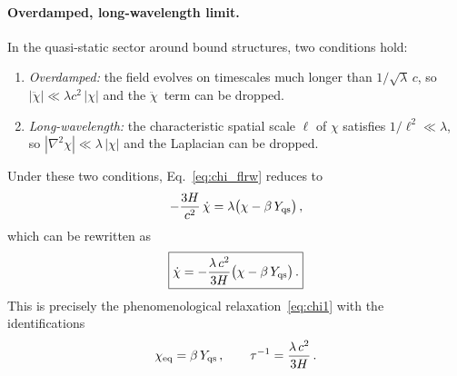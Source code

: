 \documentclass[11pt]{article}
\begin{document}
\paragraph{Overdamped, long-wavelength limit.}
In the quasi-static sector around bound structures,
two conditions hold:
\begin{enumerate}
\item \emph{Overdamped:} the field evolves on
  timescales much longer than $1/\sqrt{\lambda}\,c$,
  so $|\ddot\chi| \ll \lambda c^2\,|\chi|$ and
  the $\ddot\chi$~term can be dropped.
\item \emph{Long-wavelength:} the characteristic
  spatial scale $\ell$ of $\chi$ satisfies
  $1/\ell^2 \ll \lambda$, so
  $|\nabla^2\chi| \ll \lambda\,|\chi|$ and
  the Laplacian can be dropped.
\end{enumerate}
Under these two conditions, Eq.~\eqref{eq:chi_flrw}
reduces to
\begin{equation}
-\frac{3H}{c^2}\,\dot\chi
  = \lambda\bigl(\chi - \beta\,Y_{\rm qs}\bigr)\,,
\end{equation}
which can be rewritten as
\begin{equation}
\boxed{\dot\chi
  = -\frac{\lambda\,c^2}{3H}
    \bigl(\chi - \beta\,Y_{\rm qs}\bigr)\,.}
\label{eq:chi_relaxation}
\end{equation}
This is precisely the phenomenological
relaxation~\eqref{eq:chi1} with the identifications
\begin{equation}
\chi_{\rm eq} = \beta\,Y_{\rm qs}\,,\qquad
\tau^{-1} = \frac{\lambda\,c^2}{3H}\,.
\label{eq:tau_derived}
\end{equation}
\end{document}
